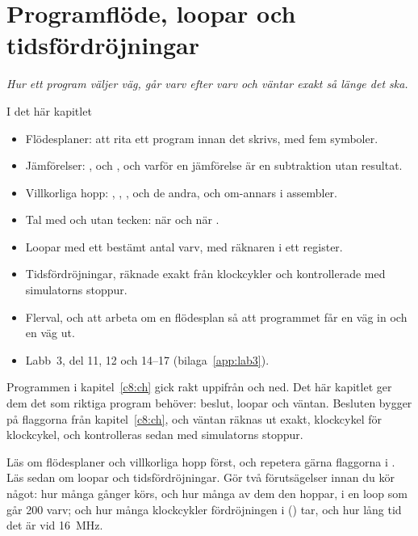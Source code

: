 
\chapter{Programflöde, loopar och tidsfördröjningar}
\label{c9:ch}

{\large\itshape Hur ett program väljer väg, går varv efter varv och väntar exakt så länge det
ska.\par}

\begin{chapterbox}{I det här kapitlet}
\begin{itemize}
  \item Flödesplaner: att rita ett program innan det skrivs, med fem symboler.
  \item Jämförelser: ,  och , och varför en jämförelse är en
    subtraktion utan resultat.
  \item Villkorliga hopp: , , ,  och de andra, och
    om-annars i assembler.
  \item Tal med och utan tecken: när  och när .
  \item Loopar med ett bestämt antal varv, med räknaren i ett register.
  \item Tidsfördröjningar, räknade exakt från klockcykler och kontrollerade med simulatorns
    stoppur.
  \item Flerval, och att arbeta om en flödesplan så att programmet får en väg in och en väg ut.
  \item Labb~3, del 11, 12 och 14--17 (bilaga~\ref{app:lab3}).
\end{itemize}
\end{chapterbox}

Programmen i kapitel~\ref{c8:ch} gick rakt uppifrån och ned. Det här kapitlet ger dem det som
riktiga program behöver: beslut, loopar och väntan. Besluten bygger på flaggorna från
kapitel~\ref{c8:ch}, och väntan räknas ut exakt, klockcykel för klockcykel, och kontrolleras sedan
med simulatorns stoppur.

Läs  om flödesplaner och villkorliga hopp först, och repetera gärna flaggorna i
. Läs sedan  om loopar och tidsfördröjningar. Gör två
förutsägelser innan du kör något: hur många gånger  körs, och hur många av dem den
hoppar, i en loop som går 200 varv; och hur många klockcykler fördröjningen i
 () tar, och hur lång tid det är vid 16~MHz.

